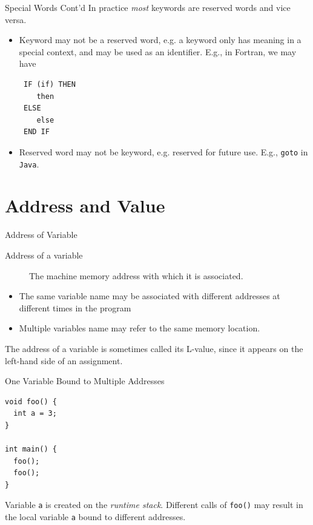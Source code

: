 \documentclass[presentation]{beamer}
\begin{document}
\begin{frame}[fragile,label={sec:orgheadline6}]{Special Words Cont'd}
 In practice \emph{most} keywords are reserved words and vice versa.

\begin{itemize}
\item Keyword may not be a reserved word, e.g. a keyword only has
meaning in a special context, and may be used as an identifier.
E.g., in Fortran, we may have

\begin{verbatim}
 IF (if) THEN
    then
 ELSE
    else
 END IF
\end{verbatim}

\item Reserved word may not be keyword, e.g. reserved for future use.
E.g., \texttt{goto} in \texttt{Java}.
\end{itemize}
\end{frame}

\section{Address and Value}
\label{sec:orgheadline14}

\begin{frame}[label={sec:orgheadline8}]{Address of Variable}
\begin{description}
\item[{Address of a variable}] The machine memory address with which it
is associated.
\end{description}


\begin{itemize}
\item The same variable name may be associated with different addresses
at different times in the program
\item Multiple variables name may refer to the same memory location.
\end{itemize}


The address of a variable is sometimes called its L-value, since it
appears on the left-hand side of an assignment.
\end{frame}

\begin{frame}[fragile,label={sec:orgheadline9}]{One Variable Bound to Multiple Addresses}
 \begin{verbatim}
void foo() {
  int a = 3;
}

int main() {
  foo();
  foo();
}
\end{verbatim}

Variable \texttt{a} is created on the \emph{runtime stack}.  Different calls of
\texttt{foo()} may result in the local variable \texttt{a} bound to different
addresses.
\end{frame}
\end{document}
